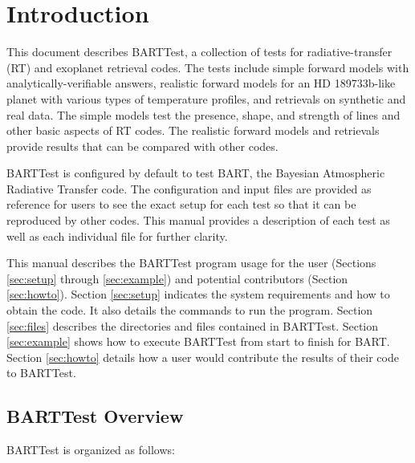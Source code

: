 \documentclass[letterpaper, 12pt]{article}
\begin{document}
\section{Introduction}
\label{sec:intro}

This document describes BARTTest, a collection of tests for 
radiative-transfer (RT) and exoplanet retrieval codes. 
The tests include simple forward models with 
analytically-verifiable answers, realistic forward models for an 
HD 189733b-like planet with various types of temperature profiles, and 
retrievals on synthetic and real data. The simple models test the 
presence, shape, and strength of lines and other basic aspects of RT codes. 
The realistic forward models and retrievals provide results that can be 
compared with other codes.

BARTTest is configured by default to test BART, the Bayesian Atmospheric 
Radiative Transfer code. The configuration and input files are provided 
as reference for users to see the exact setup for each test so that it 
can be reproduced by other codes. This manual provides a description 
of each test as well as each individual file for further clarity.

This manual describes the BARTTest program usage for the user
(Sections \ref{sec:setup} through \ref{sec:example}) and
potential contributors (Section \ref{sec:howto}).  Section \ref{sec:setup} 
indicates the system requirements and how to obtain the code. 
It also details the commands to run the program.
Section \ref{sec:files} describes the directories and files contained in 
BARTTest.  Section \ref{sec:example} shows how to execute BARTTest from start 
to finish for BART.  Section \ref{sec:howto} details how a user would 
contribute the results of their code to BARTTest. 

\newpage

\subsection{BARTTest Overview}

\noindent BARTTest is organized as follows:

\vspace{0.7cm}
\end{document}
